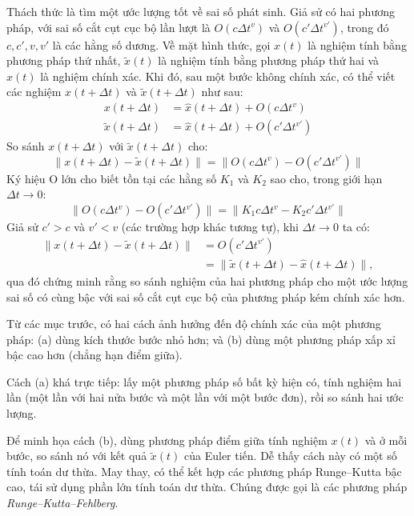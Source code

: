 Thách thức là tìm một ước lượng tốt về sai số phát sinh. Giả sử có hai phương pháp, với sai số cắt cụt cục bộ lần lượt là $O(c\Delta t^v)$ và $O(c'\Delta t^{v'})$, trong đó $c,c',v,v'$ là các hằng số dương. Về mặt hình thức, gọi $x(t)$ là nghiệm tính bằng phương pháp thứ nhất, $\tilde x(t)$ là nghiệm tính bằng phương pháp thứ hai và $\hat x(t)$ là nghiệm chính xác. Khi đó, sau một bước không chính xác, có thể viết các nghiệm $x(t+\Delta t)$ và $\tilde x(t+\Delta t)$ như sau:
\begin{equation}\begin{aligned}
x(t+\Delta t)&=\hat x(t+\Delta t)+O(c\Delta t^v)\\
\tilde x(t+\Delta t)&=\hat x(t+\Delta t)+O(c'\Delta t^{v'})
\end{aligned}\tag{4.26}\end{equation}
So sánh $x(t+\Delta t)$ với $\tilde x(t+\Delta t)$ cho:
\[\lVert x(t+\Delta t)-\tilde x(t+\Delta t)\rVert=\bigl\lVert O(c\Delta t^v)-O(c'\Delta t^{v'})\bigr\rVert\]
Ký hiệu O lớn cho biết tồn tại các hằng số $K_1$ và $K_2$ sao cho, trong giới hạn $\Delta t\to0$:
\[\bigl\lVert O(c\Delta t^v)-O(c'\Delta t^{v'})\bigr\rVert=\bigl\lVert K_1c\Delta t^v-K_2c'\Delta t^{v'}\bigr\rVert\]
Giả sử $c'>c$ và $v'<v$ (các trường hợp khác tương tự), khi $\Delta t\to0$ ta có:
\[\begin{aligned}
\lVert x(t+\Delta t)-\tilde x(t+\Delta t)\rVert
&=O(c'\Delta t^{v'})\\
&=\lVert\tilde x(t+\Delta t)-\hat x(t+\Delta t)\rVert,
\end{aligned}\]
qua đó chứng minh rằng so sánh nghiệm của hai phương pháp cho một ước lượng sai số có cùng bậc với sai số cắt cụt cục bộ của phương pháp kém chính xác hơn.

Từ các mục trước, có hai cách ảnh hưởng đến độ chính xác của một phương pháp: (a) dùng kích thước bước nhỏ hơn; và (b) dùng một phương pháp xấp xỉ bậc cao hơn (chẳng hạn điểm giữa).

Cách (a) khá trực tiếp: lấy một phương pháp số bất kỳ hiện có, tính nghiệm hai lần (một lần với hai nửa bước và một lần với một bước đơn), rồi so sánh hai ước lượng.

Để minh họa cách (b), dùng phương pháp điểm giữa tính nghiệm $x(t)$ và ở mỗi bước, so sánh nó với kết quả $\tilde x(t)$ của Euler tiến. Dễ thấy cách này có một số tính toán dư thừa. May thay, có thể kết hợp các phương pháp Runge--Kutta bậc cao, tái sử dụng phần lớn tính toán dư thừa. Chúng được gọi là các phương pháp \emph{Runge--Kutta--Fehlberg}.
